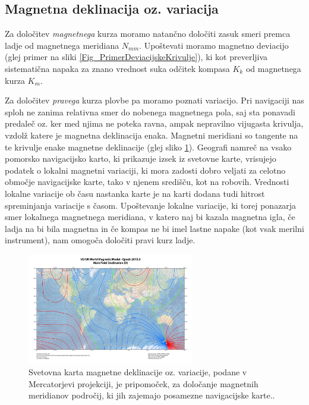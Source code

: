 \subsection{Magnetna deklinacija oz. variacija}

Za določitev \textit{magnetnega} kurza moramo natančno določiti zasuk smeri premca ladje od magnetnega meridiana $N_{mm}$. Upoštevati moramo magnetno deviacijo (glej primer na sliki \ref{Fig_PrimerDeviacijskeKrivulje}), ki kot preverljiva sistematična napaka za znano vrednost suka odčitek kompasa $K_k$ od magnetnega kurza $K_m$. 

Za določitev \textit{pravega} kurza plovbe pa moramo poznati variacijo. Pri navigaciji nas sploh ne zanima relativna smer do nobenega magnetnega pola, saj sta ponavadi predaleč oz. ker med njima ne poteka ravna, ampak nepravilno vijugasta krivulja, vzdolž katere je magnetna deklinacija enaka. Magnetni meridiani so tangente na te krivulje enake magnetne deklinacije (glej sliko \ref{Fig_KartaVariacije}). Geografi namreč na vsako pomorsko navigacijsko karto, ki prikazuje izsek iz svetovne karte, vrisujejo podatek o lokalni magnetni variaciji, ki mora zadosti dobro veljati za celotno območje navigacijske karte, tako v njenem središču, kot na robovih. Vrednosti lokalne variacije ob času nastanka karte je na karti dodana tudi hitrost spreminjanja variacije s časom. Upoštevanje lokalne variacije, ki torej ponazarja smer lokalnega magnetnega meridiana, v katero naj bi kazala magnetna igla, če ladja na bi bila magnetna in če kompas ne bi imel lastne napake (kot vsak merilni instrument), nam omogoča določiti pravi kurz ladje.


\begin{figure}[!ht]%
	\begin{center}
		\includegraphics[width=0.65\textwidth]{Predavanja/02_KompasnoDolocSmeri/figs/WMM2015_D_MERC.pdf}
	\end{center}
	\caption{Svetovna karta magnetne deklinacije oz. variacije, podane v Mercatorjevi projekciji, je pripomoček, za določanje magnetnih meridianov področij, ki jih zajemajo posamezne navigacijske karte.\cite{WorldMagModel}.}
	\label{Fig_KartaVariacije}
	\vspace{0pt}
\end{figure}

